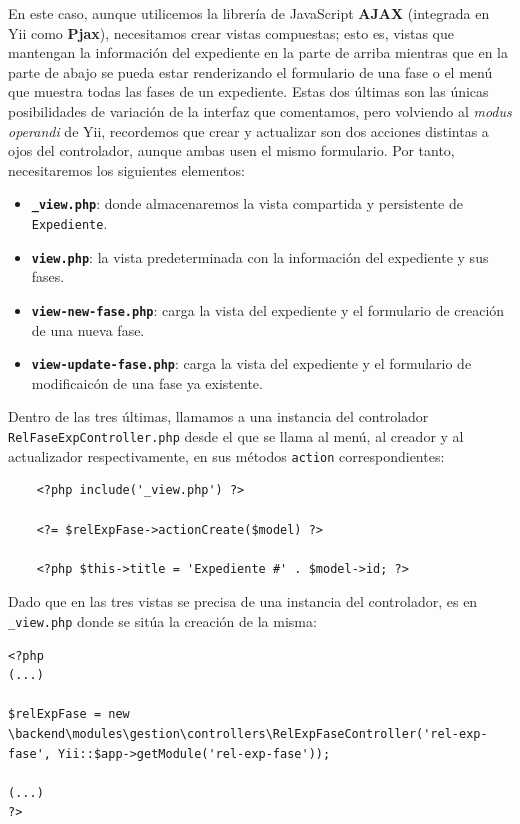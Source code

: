En este caso, aunque utilicemos la librería de JavaScript \textbf{AJAX} (integrada en Yii como \textbf{Pjax}), necesitamos crear vistas compuestas; esto es, vistas que mantengan la información del expediente en la parte de arriba mientras que en la parte de abajo se pueda estar renderizando el formulario de una fase o el menú que muestra todas las fases de un expediente. Estas dos últimas son las únicas posibilidades de variación de la interfaz que comentamos, pero volviendo al \textit{modus operandi} de Yii, recordemos que crear y actualizar son dos acciones distintas a ojos del controlador, aunque ambas usen el mismo formulario. Por tanto, necesitaremos los siguientes elementos:

\begin{itemize}
	\item \textbf{\texttt{\_view.php}}: donde almacenaremos la vista compartida y persistente de \texttt{Expediente}.
	\item \textbf{\texttt{view.php}}: la vista predeterminada con la información del expediente y sus fases.
	\item \textbf{\texttt{view-new-fase.php}}: carga la vista del expediente y el formulario de creación de una nueva fase.
	\item \textbf{\texttt{view-update-fase.php}}: carga la vista del expediente y el formulario de modificaicón de una fase ya existente.
\end{itemize}

Dentro de las tres últimas, llamamos a una instancia del controlador \\ \texttt{RelFaseExpController.php} desde el que se llama al menú, al creador y al actualizador respectivamente, en sus métodos \texttt{action} correspondientes:

\begin{verbatim}
	<?php include('_view.php') ?>
	
	<?= $relExpFase->actionCreate($model) ?>
	
	<?php $this->title = 'Expediente #' . $model->id; ?>
\end{verbatim}

Dado que en las tres vistas se precisa de una instancia del controlador, es en \texttt{\_view.php} donde se sitúa la creación de la misma:

\begin{verbatim}
<?php
(...)

$relExpFase = new \backend\modules\gestion\controllers\RelExpFaseController('rel-exp-fase', Yii::$app->getModule('rel-exp-fase'));

(...)
?>
\end{verbatim}

